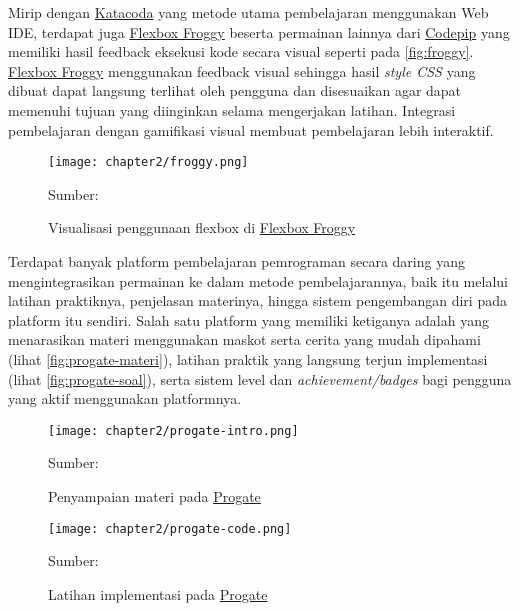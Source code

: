 Mirip dengan \href{https://www.katacoda.com/}{Katacoda} yang metode utama pembelajaran menggunakan Web IDE, terdapat juga \href{https://flexboxfroggy.com/}{Flexbox Froggy} \parencite{froggy2021media} beserta permainan lainnya dari \href{https://codepip.com/games/}{Codepip} yang memiliki hasil feedback eksekusi kode secara visual seperti pada \autoref{fig:froggy}. \href{https://flexboxfroggy.com/}{Flexbox Froggy} menggunakan feedback visual sehingga hasil \textit{style CSS} yang dibuat dapat langsung terlihat oleh pengguna dan disesuaikan agar dapat memenuhi tujuan yang diinginkan selama mengerjakan latihan. Integrasi pembelajaran dengan gamifikasi visual membuat pembelajaran lebih interaktif.

\begin{figure}[H]
  \centering
  \texttt{[image: chapter2/froggy.png]}
  \caption{Visualisasi penggunaan flexbox di \href{https://www.flexboxfroggy.com/}{Flexbox Froggy}} \label{fig:froggy}
  Sumber: \textcite{froggy2021media}
\end{figure}

Terdapat banyak platform pembelajaran pemrograman secara daring yang mengintegrasikan permainan ke dalam metode pembelajarannya, baik itu melalui latihan praktiknya, penjelasan materinya, hingga sistem pengembangan diri pada platform itu sendiri. Salah satu platform yang memiliki ketiganya adalah \textcite{progate2021media} yang menarasikan materi menggunakan maskot serta cerita yang mudah dipahami (lihat \autoref{fig:progate-materi}), latihan praktik yang langsung terjun implementasi (lihat \autoref{fig:progate-soal}), serta sistem level dan \textit{achievement/badges} bagi pengguna yang aktif menggunakan platformnya.

\begin{figure}[H]
  \centering
  \texttt{[image: chapter2/progate-intro.png]}
  \caption{Penyampaian materi pada \href{https://www.progate.com/}{Progate}} \label{fig:progate-materi}
  Sumber: \textcite{progate2021media}
\end{figure}

\begin{figure}[H]
  \centering
  \texttt{[image: chapter2/progate-code.png]}
  \caption{Latihan implementasi pada \href{https://www.progate.com/}{Progate}}\label{fig:progate-soal}
  Sumber: \textcite{progate2021media}
\end{figure}

